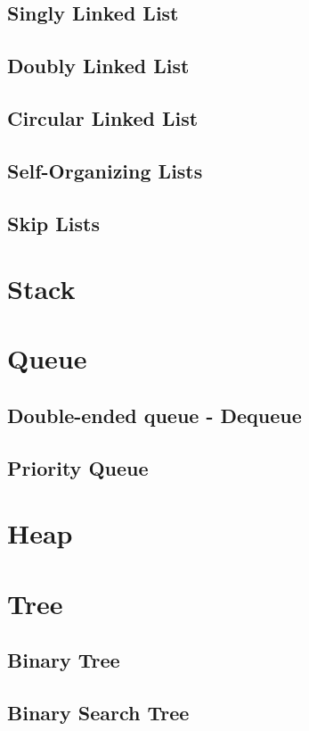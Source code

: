 \section{Singly Linked List}
\section{Doubly Linked List}
\section{Circular Linked List}
\section{Self-Organizing Lists}
\section{Skip Lists}

\chapter{Stack}

\chapter{Queue}
\section{Double-ended queue - Dequeue}
\section{Priority Queue}

\chapter{Heap}


\chapter{Tree}

\section{Binary Tree}
\section{Binary Search Tree}

